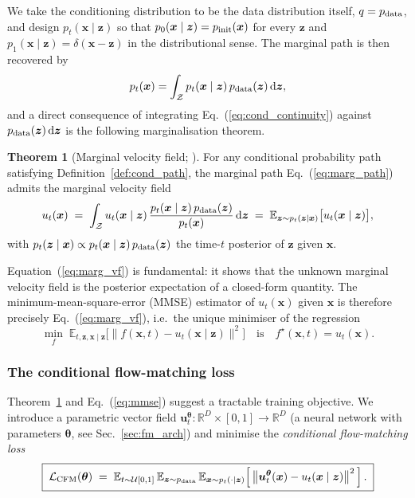 \documentclass[11pt]{article}
\newcommand{\EE}{\mathbb{E}}
\newcommand{\dd}{\mathrm{d}}
\DeclareRobustCommand{\uvec}{\bm{u}}
\DeclareRobustCommand{\xvec}{\bm{x}}
\DeclareRobustCommand{\zvec}{\bm{z}}
\DeclareRobustCommand{\thetavec}{\bm{\theta}}
\newcommand{\pinit}{p_{\rm init}}
\newcommand{\pdata}{p_{\rm data}}
\newcommand{\Ndata}{\mathbb{R}^{D}}
\theoremstyle{definition}
\newtheorem{theorem}[definition]{Theorem}
\begin{document}
We take the conditioning distribution to be the data distribution itself, $q=\pdata$, and design $p_t(\xvec\mid\zvec)$ so that $p_0(\xvec\mid\zvec) = \pinit(\xvec)$ for every $\zvec$ and $p_1(\xvec\mid\zvec) = \delta(\xvec-\zvec)$ in the distributional sense. The marginal path is then recovered by
\begin{equation}
  p_t(\xvec) = \int_{\mathcal Z} p_t(\xvec\mid\zvec)\,\pdata(\zvec)\,\dd\zvec,
  \label{eq:marg_path}
\end{equation}
and a direct consequence of integrating Eq.~(\ref{eq:cond_continuity}) against $\pdata(\zvec)\,\dd\zvec$ is the following marginalisation theorem.

\begin{theorem}[Marginal velocity field; \cite{lipman2023flowmatching}]
\label{thm:marg_vf}
For any conditional probability path satisfying Definition~\ref{def:cond_path}, the marginal path Eq.~(\ref{eq:marg_path}) admits the marginal velocity field
\begin{equation}
  u_t(\xvec) \;=\; \int_{\mathcal Z}
                u_t(\xvec\mid\zvec)\,
                \frac{p_t(\xvec\mid\zvec)\,\pdata(\zvec)}{p_t(\xvec)}\,\dd\zvec
            \;=\; \EE_{\zvec\sim p_t(\zvec\mid\xvec)}\bigl[u_t(\xvec\mid\zvec)\bigr],
  \label{eq:marg_vf}
\end{equation}
with $p_t(\zvec\mid\xvec) \propto p_t(\xvec\mid\zvec)\,\pdata(\zvec)$ the time-$t$ posterior of $\zvec$ given $\xvec$.
\end{theorem}

Equation~(\ref{eq:marg_vf}) is fundamental: it shows that the unknown marginal velocity field is the posterior expectation of a closed-form quantity. The minimum-mean-square-error (MMSE) estimator of $u_t(\xvec)$ given $\xvec$ is therefore precisely Eq.~(\ref{eq:marg_vf}), i.e.\ the unique minimiser of the regression
\begin{equation}
  \min_{f}\;\EE_{t,\zvec,\xvec\mid\zvec}\!\bigl[\|f(\xvec,t) - u_t(\xvec\mid\zvec)\|^2\bigr]
  \quad\text{is}\quad
  f^\star(\xvec,t) = u_t(\xvec).
  \label{eq:mmse}
\end{equation}

\subsubsection{The conditional flow-matching loss}

Theorem~\ref{thm:marg_vf} and Eq.~(\ref{eq:mmse}) suggest a tractable training objective. We introduce a parametric vector field $\uvec_t^{\thetavec}:\Ndata\!\times\![0,1]\to\Ndata$ (a neural network with parameters $\thetavec$, see Sec.~\ref{sec:fm_arch}) and minimise the \emph{conditional flow-matching loss}
\begin{equation}
  \boxed{\;\mathcal L_{\rm CFM}(\thetavec)
  \;=\;
  \EE_{t\sim\mathcal U[0,1]}\,
  \EE_{\zvec\sim\pdata}\,
  \EE_{\xvec\sim p_t(\cdot\mid\zvec)}
  \!\left[\,\bigl\|\uvec_t^{\thetavec}(\xvec) - u_t(\xvec\mid\zvec)\bigr\|^2\,\right].\;}
  \label{eq:cfm}
\end{equation}
\end{document}
